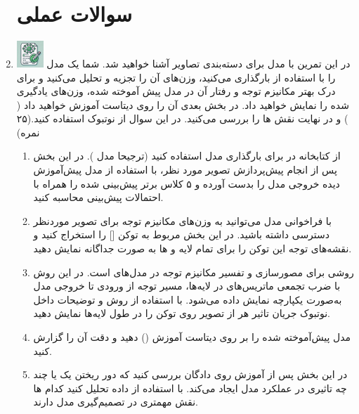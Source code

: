 \documentclass[12pt]{article}
\begin{document}
\begin{enumerate}
    \section*{سوالات عملی} 
    \item \includegraphics[width=1cm]{figs/Allowed_with_contributino.jpg}
    در این تمرین با مدل  برای دسته‌بندی تصاویر آشنا خواهید شد. شما یک مدل   را با استفاده از  بارگذاری می‌کنید، وزن‌های  آن را تجزیه و تحلیل می‌کنید و برای درک بهتر مکانیزم توجه و رفتار آن در مدل پیش آموخته شده، وزن‌های یادگیری شده را نمایش خواهید داد. در بخش بعدی آن را روی دیتاست   آموزش خواهید داد ( ) و در نهایت نقش ها را بررسی می‌کنید. در این سوال از نوتبوک  استفاده کنید.(۲۵ نمره)
    \begin{enumerate}
        \item از کتابخانه  در  برای بارگذاری مدل  استفاده کنید (ترجیحا مدل ). در این بخش پس از انجام پیش‌پردازش تصویر مورد نظر، با استفاده از مدل پیش‌آموزش دیده خروجی مدل را بدست آورده و ۵ کلاس برتر پیش‌بینی شده را  همراه با احتمالات پیش‌بینی محاسبه کنید. 
        \item با فراخوانی مدل می‌توانید به وزن‌های مکانیزم توجه برای تصویر مورد‌نظر دسترسی داشته باشید. در این بخش  مربوط به توکن [] را استخراج کنید و نقشه‌های توجه این توکن را برای تمام لایه و ها به صورت جداگانه نمایش دهید.
        \item \href{https://aclanthology.org/2020.acl-main.385.pdf}{} روشی برای مصورسازی و تفسیر مکانیزم توجه در مدل‌های  است. در این روش با ضرب تجمعی ماتریس‌های  در لایه‌ها، مسیر توجه از ورودی تا خروجی مدل به‌صورت یکپارچه نمایش داده می‌شود. با استفاده از روش  و توضیحات داخل نوتبوک جریان تاثیر هر  از تصویر روی توکن  را در طول لایه‌ها نمایش دهید. 
        \item مدل پیش‌آموخته شده را بر روی دیتاست  آموزش () دهید و دقت آن را گزارش کنید. 
        \item در این بخش پس از آموزش روی دادگان بررسی کنید که دور ریختن یک یا چند  چه تاثیری در عملکرد مدل ایجاد می‌کند. با استفاده از داده  تحلیل کنید کدام ها نقش مهمتری در تصمیم‌گیری مدل دارند.  

\end{enumerate}
\end{enumerate}
\end{document}
